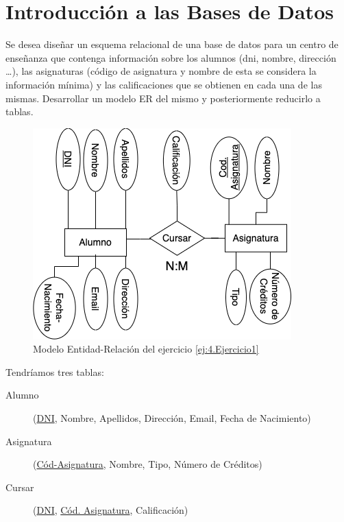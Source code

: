\section{Introducción a las Bases de Datos}



\begin{ejercicio}\label{ej:4.Ejercicio1}
    Se desea diseñar un esquema relacional de una base de datos para un centro de enseñanza que contenga información sobre los alumnos (dni, nombre, dirección \dots), las asignaturas (código de asignatura y nombre de esta se considera la información mínima) y las calificaciones que se obtienen en cada una de las mismas. Desarrollar un modelo ER del mismo y posteriormente reducirlo a tablas.

    \begin{figure}[H]
        \centering
        \includegraphics[width=0.6\linewidth]{Imagenes/Ejercicio 1.png}
        \caption{Modelo Entidad-Relación del ejercicio \ref{ej:4.Ejercicio1}}
        \label{fig:Ej1}
    \end{figure}


    Tendríamos tres tablas:
    \begin{description}
        \item [Alumno] (\underline{DNI}, Nombre, Apellidos, Dirección, Email, Fecha de Nacimiento)

        \item [Asignatura] (\underline{Cód-Asignatura}, Nombre, Tipo, Número de Créditos)

        \item [Cursar] (\underline{DNI}, \underline{Cód. Asignatura}, Calificación)
    \end{description}
\end{ejercicio}

